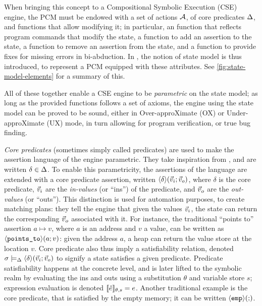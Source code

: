 When bringing this concept to a Compositional Symbolic Execution (CSE) engine, the PCM must be endowed with a set of actions ${\cal{A}}$, of core predicates $\Delta$, and functions that allow modifying it; in particular, an \execac{} function that reflects program commands that modify the state, a \produce{} function to add an assertion to the state, a \consume{} function to remove an assertion from the state, and a \fix{} function to provide fixes for missing errors in bi-abduction. In \cite{cse1,cse2,sacha-phd}, the notion of state model is thus introduced, to represent a PCM equipped with these attributes. See \autoref{fig:state-model-elements} for a summary of this. 

All of these together enable a CSE engine to be \emph{parametric} on the state model; as long as the provided functions follows a set of axioms, the engine using the state model can be proved to be sound, either in Over-approXimate (OX) or Under-approXimate (UX) mode, in turn allowing for program verification, or true bug finding.

\emph{Core predicates} (sometimes simply called predicates) are used to make the assertion language of the engine parametric. They take inspiration from \cite{abstractseplogic}, and are written $\delta\in\Delta$. To enable this parametricity, the assertions of the language are extended with a core predicate assertion, written $\left<\delta\right>\!(\vec{v}_i;\vec{v}_o)$, where $\delta$ is the core predicate, $\vec{v}_i$ are the \emph{in-values} (or ``ins'') of the predicate, and $\vec{v}_o$ are the \emph{out-values} (or ``outs''). This distinction is used for automation purposes, to create matching plans: they tell the engine that given the values $\vec{v}_i$, the state can return the corresponding $\vec{v}_o$ associated with it. For instance, the traditional ``points to'' assertion $a \mapsto v$, where $a$ is an address and $v$ a value, can be written as $\left<\texttt{points\_to}\right>\!(a;v)$: given the address $a$, a heap can return the value store at the location $v$. Core predicate also thus imply a satisfiability relation, denoted $\sigma\models_{\Delta}\left<\delta\right>\!(\vec{v}_i;\vec{v}_o)$ to signify a state satisfies a given predicate. Predicate satisfiability happens at the concrete level, and is later lifted to the symbolic realm by evaluating the ins and outs using a substitution $\theta$ and variable store $s$; expression evaluation is denoted $\llbracket\hat{e}\rrbracket_{\theta,s}=e$. Another traditional example is the \emp{} core predicate, that is satisfied by the empty memory; it can be written $\left<\texttt{emp}\right>\!(;\!)$.

